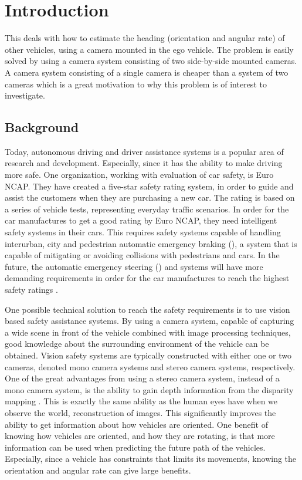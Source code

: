 \chapter{Introduction}
\label{cha:intro}
This \ms deals with how to estimate the heading (orientation and angular rate) of other vehicles, using a camera mounted in the ego vehicle.
The problem is easily solved by using a camera system consisting of two side-by-side mounted cameras.
A camera system consisting of a single camera is cheaper than a system of two cameras which is a great motivation to why this problem is of interest to investigate.

\section{Background}
Today, autonomous driving and driver assistance systems is a popular area of research and development.
Especially, since it has the ability to make driving more safe. 
One organization, working with evaluation of car safety, is Euro NCAP.
They have created a five-star safety rating system, in order to guide and assist the customers when they are purchasing a new car.
The rating is based on a series of vehicle tests, representing everyday traffic scenarios. 
In order for the car manufactures to get a good rating by Euro NCAP, they need intelligent safety systems in their cars.
This requires safety systems capable of handling \eg interurban, city and pedestrian automatic emergency braking (\abbrAEB), \ie a system that is capable of mitigating or avoiding collisions with pedestrians and cars.
In the future, the automatic emergency steering (\abbrAES) and \abbrAEB systems will have more demanding requirements in order for the car manufactures to reach the highest safety ratings \cite{EuroNCAP:2017}.

One possible technical solution to reach the safety requirements is to use vision based safety assistance systems.
By using a camera system, capable of capturing a wide scene in front of the vehicle combined with image processing techniques, good knowledge about the surrounding environment of the vehicle can be obtained.
Vision safety systems are typically constructed with either one or two cameras, denoted mono camera systems and stereo camera systems, respectively.
One of the great advantages from using a stereo camera system, instead of a mono camera system, is the ability to gain depth information from the disparity mapping \citep{Sivaraman:2013}.
This is exactly the same ability as the human eyes have when we observe the world, \ie reconstruction of  images.
This significantly improves the ability to get information about how vehicles are \eg oriented.
One benefit of knowing how vehicles are oriented, and how they are rotating, is that more information can be used when predicting the future path of the vehicles.
Especially, since \eg a vehicle has constraints that limits its movements, knowing the orientation and angular rate can give large benefits.


